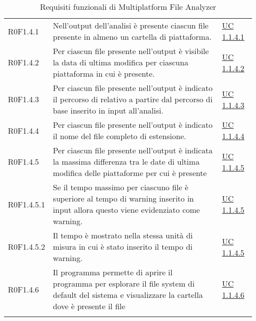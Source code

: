 \begin{center}
\begin{longtable}{p{4.2cm}!{\color{white}\vrule width 0.5mm}p{6cm}!{\color{white}\vrule width 0.5mm}p{2.5cm}!{\color{white}\vrule width 0.5mm}}
				\hspace{4mm}\hypertarget{R0F1.4.1}{R0F1.4.1} & Nell'output dell'analisi è presente ciascun file presente in almeno un cartella di piattaforma. & \hyperref[subsec:UC1.1.4.1]{UC 1.1.4.1}\\
				
				\hspace{4mm}\hypertarget{R0F1.4.2}{R0F1.4.2} & Per ciascun file presente nell'output è visibile la data di ultima modifica per ciascuna piattaforma in cui è presente. & \hyperref[subsec:UC1.1.4.2]{UC 1.1.4.2}\\
				
				\hspace{4mm}\hypertarget{R0F1.4.3}{R0F1.4.3} & Per ciascun file presente nell'output è indicato il percorso di relativo a partire dal percorso di base inserito in input all'analisi. & \hyperref[subsec:UC1.1.4.3]{UC 1.1.4.3}\\
				
				\hspace{4mm}\hypertarget{R0F1.4.4}{R0F1.4.4} & Per ciascun file presente nell'output è indicato il nome del file completo di estensione. & \hyperref[subsec:UC1.1.4.4]{UC 1.1.4.4}\\
				
				\hspace{4mm}\hypertarget{R0F1.4.5}{R0F1.4.5} & Per ciascun file presente nell'output è indicata la massima differenza tra le date di ultima modifica delle piattaforme per cui è presente & \hyperref[subsec:UC1.1.4.5]{UC 1.1.4.5}\\
				
				\hspace{6mm}\hypertarget{R0F1.4.5.1}{R0F1.4.5.1} & Se il tempo massimo per ciascuno file è superiore al tempo di warning inserito in input allora questo viene evidenziato come warning. & \hyperref[subsec:UC1.1.4.5]{UC 1.1.4.5}\\
				
				\hspace{6mm}\hypertarget{R0F1.4.5.2}{R0F1.4.5.2} & Il tempo è mostrato nella stessa unità di misura in cui è stato inserito il tempo di warning. & \hyperref[subsec:UC1.1.4.5]{UC 1.1.4.5}\\
				
				\hspace{4mm}\hypertarget{R0F1.4.6}{R0F1.4.6} & Il programma permette di aprire il programma per esplorare il file system di default del sistema e visualizzare la cartella dove è presente il file & \hyperref[subsec:UC1.1.4.6]{UC 1.1.4.6}\\
				
				\hline
				\caption{Requisiti funzionali di Multiplatform File Analyzer}
			\end{longtable}
		\end{center}

